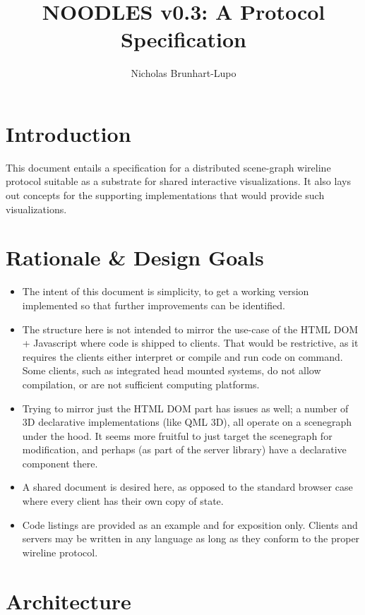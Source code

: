 \documentclass[11pt, oneside]{amsart}
\title{NOODLES v0.3: A Protocol Specification}
\author{Nicholas Brunhart-Lupo}
\begin{document}
\maketitle
\tableofcontents

\section{Introduction}

This document entails a specification for a distributed scene-graph wireline protocol suitable as a substrate for shared interactive visualizations. It also lays out concepts for the supporting implementations that would provide such visualizations.


\section{Rationale \& Design Goals}

\begin{itemize}
\item The intent of this document is simplicity, to get a working version implemented so that further improvements can be identified.
\item The structure here is not intended to mirror the use-case of the HTML DOM + Javascript where code is shipped to clients. That would be restrictive, as it requires the clients either interpret or compile and run code on command. Some clients, such as integrated head mounted systems, do not allow compilation, or are not sufficient computing platforms.
\item Trying to mirror just the HTML DOM part has issues as well; a number of 3D declarative implementations (like QML 3D), all operate on a scenegraph under the hood. It seems more fruitful to just target the scenegraph for modification, and perhaps (as part of the server library) have a declarative component there.
\item A shared document is desired here, as opposed to the standard browser case where every client has their own copy of state.
\item Code listings are provided as an example and for exposition only. Clients and servers may be written in any language as long as they conform to the proper wireline protocol.
\end{itemize}


\section{Architecture}
\end{document}

